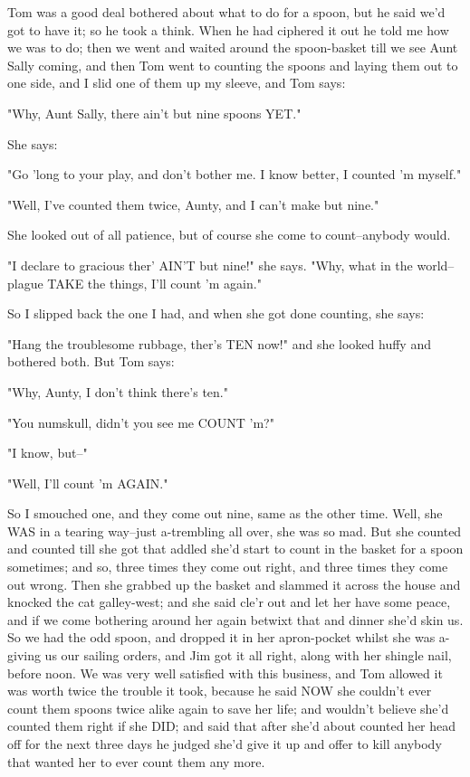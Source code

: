 Tom was a good deal bothered about what to do for a spoon, but he said
we'd got to have it; so he took a think.  When he had ciphered it out he
told me how we was to do; then we went and waited around the spoon-basket
till we see Aunt Sally coming, and then Tom went to counting the spoons
and laying them out to one side, and I slid one of them up my sleeve, and
Tom says:

"Why, Aunt Sally, there ain't but nine spoons YET."

She says:

"Go 'long to your play, and don't bother me.  I know better, I counted 'm
myself."

"Well, I've counted them twice, Aunty, and I can't make but nine."

She looked out of all patience, but of course she come to count--anybody
would.

"I declare to gracious ther' AIN'T but nine!" she says.  "Why, what in
the world--plague TAKE the things, I'll count 'm again."

So I slipped back the one I had, and when she got done counting, she
says:

"Hang the troublesome rubbage, ther's TEN now!" and she looked huffy and
bothered both.  But Tom says:

"Why, Aunty, I don't think there's ten."

"You numskull, didn't you see me COUNT 'm?"

"I know, but--"

"Well, I'll count 'm AGAIN."

So I smouched one, and they come out nine, same as the other time.  Well,
she WAS in a tearing way--just a-trembling all over, she was so mad.  But
she counted and counted till she got that addled she'd start to count in
the basket for a spoon sometimes; and so, three times they come out
right, and three times they come out wrong.  Then she grabbed up the
basket and slammed it across the house and knocked the cat galley-west;
and she said cle'r out and let her have some peace, and if we come
bothering around her again betwixt that and dinner she'd skin us.  So we
had the odd spoon, and dropped it in her apron-pocket whilst she was
a-giving us our sailing orders, and Jim got it all right, along with her
shingle nail, before noon.  We was very well satisfied with this
business, and Tom allowed it was worth twice the trouble it took, because
he said NOW she couldn't ever count them spoons twice alike again to save
her life; and wouldn't believe she'd counted them right if she DID; and
said that after she'd about counted her head off for the next three days
he judged she'd give it up and offer to kill anybody that wanted her to
ever count them any more.

